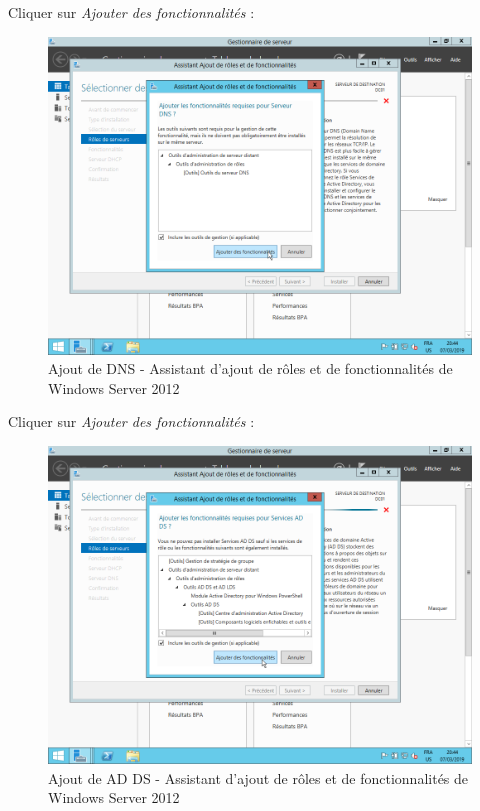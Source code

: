 \newpage
Cliquer sur \textit{Ajouter des fonctionnalités} :
\begin{figure}[h!]
    \begin{center}
        \includegraphics[scale=0.6]{WS2012_Screenshots/22.png}
        \caption{Ajout de DNS - Assistant d'ajout de rôles et de fonctionnalités de Windows Server 2012}
        \label{WS2012_Screenshots/22}
    \end{center}
\end{figure}
\FloatBarrier

\newpage
Cliquer sur \textit{Ajouter des fonctionnalités} :
\begin{figure}[h!]
    \begin{center}
        \includegraphics[scale=0.6]{WS2012_Screenshots/23.png}
        \caption{Ajout de AD DS - Assistant d'ajout de rôles et de fonctionnalités de Windows Server 2012}
        \label{WS2012_Screenshots/23}
    \end{center}
\end{figure}
\FloatBarrier

